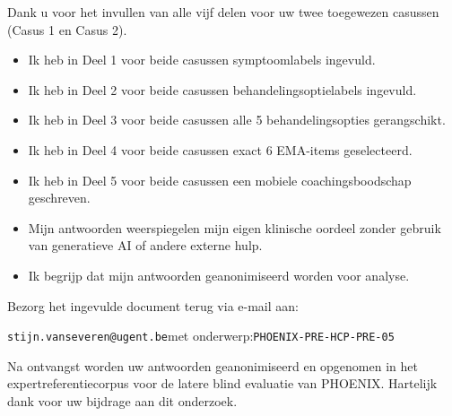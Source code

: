 \documentclass[11pt,a4paper]{article}
\begin{document}
Dank u voor het invullen van alle vijf delen voor uw twee toegewezen casussen
(Casus 1 en Casus 2).

\begin{instrbox}[title=Checklist voor terugbezorging]
\begin{itemize}
\item[$\square$] Ik heb in Deel 1 voor beide casussen symptoomlabels ingevuld.
\item[$\square$] Ik heb in Deel 2 voor beide casussen behandelingsoptielabels ingevuld.
\item[$\square$] Ik heb in Deel 3 voor beide casussen alle 5 behandelingsopties gerangschikt.
\item[$\square$] Ik heb in Deel 4 voor beide casussen exact 6 EMA-items geselecteerd.
\item[$\square$] Ik heb in Deel 5 voor beide casussen een mobiele coachingsboodschap geschreven.
\item[$\square$] Mijn antwoorden weerspiegelen mijn eigen klinische oordeel zonder gebruik van generatieve AI of andere externe hulp.
\item[$\square$] Ik begrijp dat mijn antwoorden geanonimiseerd worden voor analyse.
\end{itemize}
\end{instrbox}

\medskip
Bezorg het ingevulde document terug via e-mail aan:
\begin{center}
\texttt{stijn.vanseveren@ugent.be}\quad met onderwerp:\quad \texttt{PHOENIX-PRE-HCP-PRE-05}
\end{center}

\vspace{0.5em}
\begin{tcolorbox}[colback=AccentBlue,colframe=PrimaryBlue,arc=2mm,boxrule=0.6pt,left=8pt,right=8pt,top=7pt,bottom=7pt]
\small\centering
Na ontvangst worden uw antwoorden geanonimiseerd en opgenomen in het expertreferentiecorpus
voor de latere blind evaluatie van PHOENIX. Hartelijk dank voor uw bijdrage aan dit onderzoek.
\end{tcolorbox}
\end{document}
